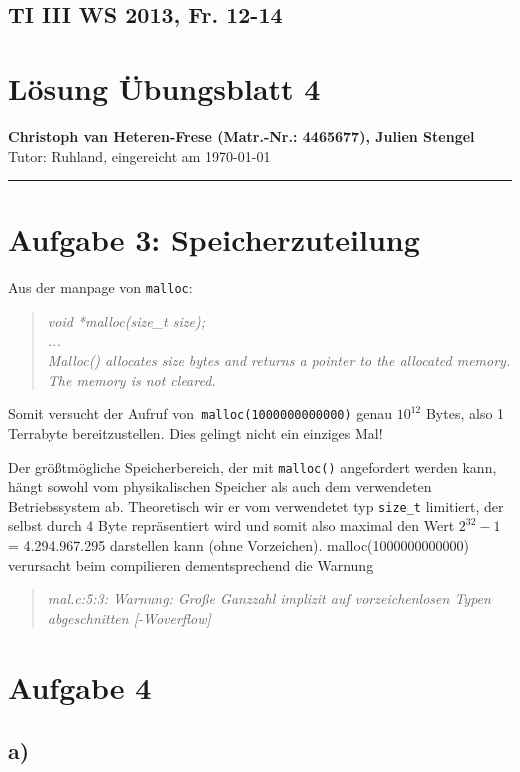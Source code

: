 \documentclass[11pt, a4paper]{scrartcl}
\begin{document}
\lstset{basicstyle=\small,
		 inputencoding=latin1,
		stringstyle=\ttfamily,
		identifierstyle=,
		showstringspaces=false,
		language=c,
		frame=trBL}
%
\subsection*{TI III WS 2013, Fr. 12-14}
\section*{Lösung Übungsblatt 4}
\textbf{Christoph van Heteren-Frese (Matr.-Nr.: 4465677), Julien  Stengel } \\%
Tutor: Ruhland, eingereicht am \today\\
\hrule
%
\section*{Aufgabe 3: Speicherzuteilung}
Aus der manpage von \texttt{malloc}:
\begin{quotation}
\noindent
\textit{void *malloc(size\_t size);\\
...\\
Malloc() allocates  size  bytes and returns a pointer to the allocated memory.	The memory is not cleared.}
\end{quotation}
Somit versucht der Aufruf von\texttt{ malloc(1000000000000)} genau  $10^{12}$ Bytes, also 1 Terrabyte bereitzustellen.
Dies gelingt nicht ein einziges Mal!	

Der größtmögliche Speicherbereich, der mit \texttt{malloc()} angefordert werden kann, hängt sowohl vom physikalischen Speicher als auch dem verwendeten Betriebssystem ab. Theoretisch wir er vom verwendetet typ \texttt{size\_t} limitiert, der selbst durch 4 Byte repräsentiert wird und somit also maximal den Wert $2^{32}-1$ = 4.294.967.295 darstellen kann (ohne Vorzeichen). malloc(1000000000000) verursacht beim compilieren dementsprechend die Warnung
\begin{quote}
\textit{mal.c:5:3: Warnung: Große Ganzzahl implizit auf vorzeichenlosen Typen abgeschnitten [-Woverflow]}
\end{quote}
\section*{Aufgabe 4}
\subsection*{a)} 

\end{document}
